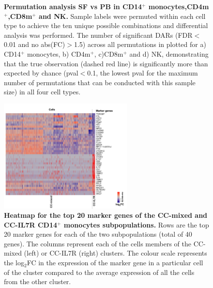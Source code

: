 \begin{figure}[htbp]
\begin{subfigure}[b]{0.45\textwidth}
\caption{}
\end{subfigure}
\caption[Permutation analysis SF vs PB in CD14$^+$ monocytes,CD4m$^+$,CD8m$^+$ and NK.]{\textbf{Permutation analysis SF vs PB in CD14$^+$ monocytes,CD4m$^+$,CD8m$^+$ and NK.} Sample labels were permuted within each cell type to achieve the ten unique possible combinations and differential analysis was performed. The number of significant DARs (FDR$<$0.01 and no abs(FC)$>$1.5) across all permutations in plotted for a)  CD14$^+$ monocytes, b) CD4m$^+$, c)CD8m$^+$ and d) NK, demonstrating that the true observation (dashed red line) is significantly more than expected by chance (pval$<$0.1, the lowest pval for the maximum number of permutations that can be conducted with this sample size) in all four cell types.}
\label{figure:PsA_perm_analysis}
\end{figure}



\begin{figure}[htbp]
\centering
\includegraphics[width=0.6\textwidth]{./Appendix/pdfs/Chapter5/PSA_10X_heatmap_SF_PB_monocytes_clusters_mixed_and_IL7R}
\caption[Heatmap for the top 20 marker genes of the CC-mixed and CC-IL7R CD14$^+$ monocytes subpopulations.]{\textbf{Heatmap for the top 20 marker genes of the CC-mixed and CC-IL7R CD14$^+$ monocytes subpopulations.} Rows are the top 20 marker genes for each of the two subpopulations (total of 40 genes). The columns represent each of the cells members of the CC-mixed (left) or CC-IL7R (right) clusters. The colour scale represents the log$_2$FC in the expression of the marker gene in a particular cell of the cluster compared to the average expression of all the cells from the other cluster.}
\label{figure:PSA_scRNAseq_CC_mixed_and_IL7R_markers_heatmap}
\end{figure}

